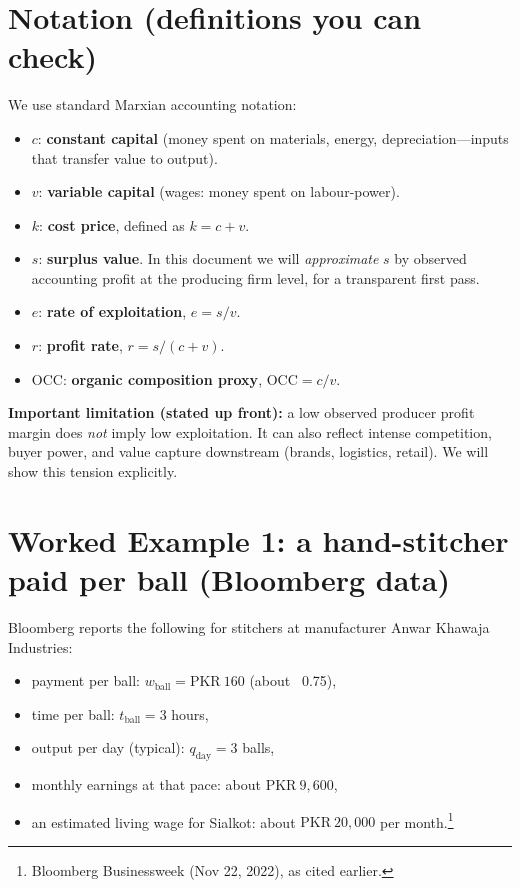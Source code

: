 \documentclass[11pt]{article}
\newcommand{\PKR}{\text{PKR}}
\newcommand{\USD}{\text{USD}}
\newcommand{\uBall}{\text{ball}}
\newcommand{\uDay}{\text{day}}
\newcommand{\cconst}{c} %
\newcommand{\vvar}{v}   %
\newcommand{\splus}{s}  %
\newcommand{\kcost}{k}  %
\newcommand{\eRate}{e}  %
\newcommand{\pRate}{r}  %
\newcommand{\OCC}{\mathrm{OCC}} %
\begin{document}
\section{Notation (definitions you can check)}
We use standard Marxian accounting notation:
\begin{itemize}[leftmargin=*]
\item \(\cconst\): \textbf{constant capital} (money spent on materials, energy, depreciation---inputs that transfer value to output).
\item \(\vvar\): \textbf{variable capital} (wages: money spent on labour-power).
\item \(\kcost\): \textbf{cost price}, defined as \(\kcost=\cconst+\vvar\).
\item \(\splus\): \textbf{surplus value}. In this document we will \emph{approximate} \(\splus\) by observed accounting profit at the producing firm level, for a transparent first pass.
\item \(\eRate\): \textbf{rate of exploitation}, \(\eRate=\splus/\vvar\).
\item \(\pRate\): \textbf{profit rate}, \(\pRate=\splus/(\cconst+\vvar)\).
\item \(\OCC\): \textbf{organic composition proxy}, \(\OCC=\cconst/\vvar\).
\end{itemize}

\bigskip
\noindent
\textbf{Important limitation (stated up front):}
a low observed producer profit margin does \emph{not} imply low exploitation.
It can also reflect intense competition, buyer power, and value capture downstream (brands, logistics, retail).
We will show this tension explicitly.

\section{Worked Example 1: a hand-stitcher paid per ball (Bloomberg data)}

Bloomberg reports the following for stitchers at manufacturer Anwar Khawaja Industries:
\begin{itemize}[leftmargin=*]
\item payment per ball: \(w_{\uBall}=\PKR{}~160\) (about \USD{}~0.75),
\item time per ball: \(t_{\uBall}=3\) hours,
\item output per day (typical): \(q_{\uDay}=3\) balls,
\item monthly earnings at that pace: about \(\PKR{}~9{,}600\),
\item an estimated living wage for Sialkot: about \(\PKR{}~20{,}000\) per month.\footnote{Bloomberg Businessweek (Nov 22, 2022), as cited earlier.}
\end{itemize}
\end{document}

